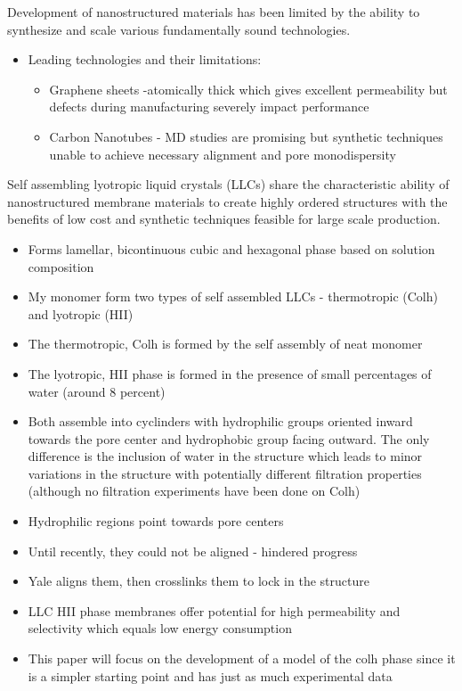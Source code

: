 \documentclass{article}
\begin{document}
	Development of nanostructured materials has been limited by the ability to synthesize and scale various fundamentally sound technologies.
	\begin{itemize}
		\item Leading technologies and their limitations:
		\begin{itemize}
			\item Graphene sheets -atomically thick which gives excellent permeability but defects during manufacturing severely impact performance
			\item Carbon Nanotubes - MD studies are promising but synthetic techniques unable to achieve necessary alignment and pore monodispersity
		\end{itemize}
	\end{itemize} 
	Self assembling lyotropic liquid crystals (LLCs) share the characteristic ability of nanostructured membrane materials to create highly ordered structures with the benefits of low cost and synthetic techniques feasible for large scale production.
	\begin{itemize}
		\item Forms lamellar, bicontinuous cubic and hexagonal phase based on solution composition
		\item My monomer form two types of self assembled LLCs - thermotropic (Colh) and lyotropic (HII) 
		\item The thermotropic, Colh is formed by the self assembly of neat monomer
		\item The lyotropic, HII phase is formed in the presence of small percentages of water (around 8 percent)
		\item Both assemble into cyclinders with hydrophilic groups oriented inward towards the pore center and hydrophobic group facing outward. The only difference is the inclusion of water in the structure which leads to minor variations in the structure with potentially different filtration properties (although no filtration experiments have been done on Colh)  
		\item Hydrophilic regions point towards pore centers
		\item Until recently, they could not be aligned - hindered progress
		\item Yale aligns them, then crosslinks them to lock in the structure
		\item LLC HII phase membranes offer potential for high permeability and selectivity which equals low energy consumption
		\item This paper will focus on the development of a model of the colh phase since it is a simpler starting point and has just as much experimental data
	\end{itemize}
\end{document}
